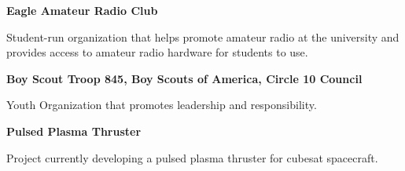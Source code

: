 \documentclass[letterpaper,ddMMMyyyy,nonstopmode]{simpleresumecv}
\newcommand{\descriptionWidth}{33em}
\newenvironment{Description}
{%
	\SmallGap
	\par
	\begin{Detail}
		\Item
		\begin{minipage}{\descriptionWidth}
}
{\par
\end{minipage}
\end{Detail}
}
\begin{document}
\begin{Body}


            \Entry
            \textbf{Eagle Amateur Radio Club}
            \hfill{}
            \begin{Description}
                Student-run organization that helps promote amateur radio at the university and provides access to amateur radio hardware for students to use.

            \end{Description}

            \Gap

            \Entry
            \textbf{Boy Scout Troop 845, Boy Scouts of America, Circle 10 Council}
            \hfill{}

            \begin{Description}
                    Youth Organization that promotes leadership and responsibility.
            \end{Description}



            \Entry
            \textbf{Pulsed Plasma Thruster}
            \hfill

            \begin{Description}
                Project currently developing a pulsed plasma thruster for cubesat spacecraft.
            \end{Description}



\end{Body}
\end{document}
